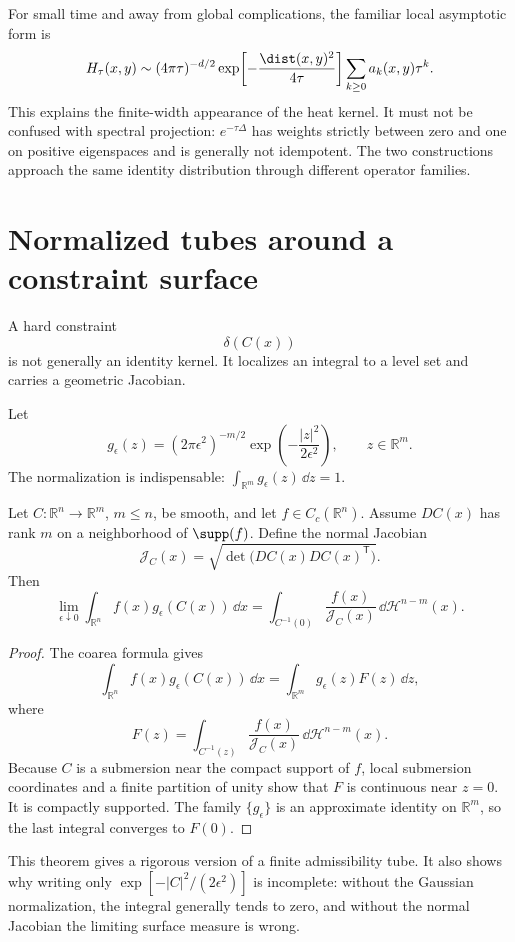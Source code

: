 \documentclass[11pt]{article}
\newcommand{\Jcal}{\mathcal J}
\begin{document}
For small time and away from global complications, the familiar local
asymptotic form is
\[
H_\tau(x,y)
\sim
(4\pi\tau)^{-d/2}
\exp\!\left[-\frac{\dist(x,y)^2}{4\tau}\right]
\sum_{k\geq0}a_k(x,y)\tau^k.
\]
This explains the finite-width appearance of the heat kernel. It must not be
confused with spectral projection: \(e^{-\tau\Delta}\) has weights strictly
between zero and one on positive eigenspaces and is generally not idempotent.
The two constructions approach the same identity distribution through
different operator families.

\section{Normalized tubes around a constraint surface}

A hard constraint
\[
\delta(C(x))
\]
is not generally an identity kernel. It localizes an integral to a level set
and carries a geometric Jacobian.

Let
\[
g_\epsilon(z)
=(2\pi\epsilon^2)^{-m/2}
\exp\!\left(-\frac{|z|^2}{2\epsilon^2}\right),
\qquad z\in\mathbb R^m.
\]
The normalization is indispensable:
\(\int_{\mathbb R^m}g_\epsilon(z)\,\dd z=1\).

\begin{theorem}
\label{thm:constraint-tube}
Let \(C:\mathbb R^n\to\mathbb R^m\), \(m\leq n\), be smooth, and let
\(f\in C_c(\mathbb R^n)\). Assume \(DC(x)\) has rank \(m\) on a neighborhood
of \(\supp(f)\). Define the normal Jacobian
\[
\Jcal_C(x)
=\sqrt{\det\!\bigl(DC(x)DC(x)^{\mathsf T}\bigr)}.
\]
Then
\[
\lim_{\epsilon\downarrow0}
\int_{\mathbb R^n}f(x)g_\epsilon(C(x))\,\dd x
=
\int_{C^{-1}(0)}
\frac{f(x)}{\Jcal_C(x)}
\,\dd\mathcal H^{n-m}(x).
\]
\end{theorem}

\begin{proof}
The coarea formula gives
\[
\int_{\mathbb R^n}f(x)g_\epsilon(C(x))\,\dd x
=
\int_{\mathbb R^m}g_\epsilon(z)F(z)\,\dd z,
\]
where
\[
F(z)
=
\int_{C^{-1}(z)}
\frac{f(x)}{\Jcal_C(x)}
\,\dd\mathcal H^{n-m}(x).
\]
Because \(C\) is a submersion near the compact support of \(f\), local
submersion coordinates and a finite partition of unity show that \(F\) is
continuous near \(z=0\). It is compactly supported. The family
\(\{g_\epsilon\}\) is an approximate identity on \(\mathbb R^m\), so the last
integral converges to \(F(0)\).
\end{proof}

This theorem gives a rigorous version of a finite admissibility tube. It also
shows why writing only
\(\exp[-|C|^2/(2\epsilon^2)]\) is incomplete: without the Gaussian
normalization, the integral generally tends to zero, and without the normal
Jacobian the limiting surface measure is wrong.
\end{document}
